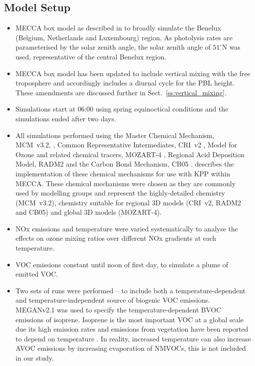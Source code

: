 \subsection{Model Setup} \label{ss:model_setup}
\begin{itemize}
    \item MECCA box model as described in \citet{Coates:2015} to broadly simulate the Benelux (Belgium, Netherlands and Luxembourg) region. As photolysis rates are parameterised by the solar zenith angle, the solar zenith angle of $51^{\circ}$N was used, representative of the central Benelux region.
    \item MECCA box model has been updated to include vertical mixing with the free troposphere and accordingly includes a diurnal cycle for the PBL height. These amendments are discussed further in Sect.~\ref{ss:vertical_mixing}.
    \item Simulations start at 06:00 using spring equinoctical conditions and the simulations ended after two days.
    \item All simulations performed using the Master Chemical Mechanism, MCM~v3.2, \citep{MCM_Site}, Common Representative Intermediates, CRI~v2 \citep{Jenkin:2008}, Model for Ozone and related chemical tracers, MOZART-4 \citep{Emmons:2010}, Regional Acid Deposition Model, RADM2 \citep{Stockwell:1990} and the Carbon Bond Mechanism, CB05 \citep{Yarwood:2005}. \citet{Coates:2015} describes the implementation of these chemical mechanisms for use with KPP within MECCA. These chemical mechanisms were chosen as they are commonly used by modelling groups and represent the highly-detailed chemistry (MCM~v3.2), chemistry suitable for regional 3D models (CRI~v2, RADM2 and CB05) and global 3D models (MOZART-4).
    \item NOx emissions and temperature were varied systematically to analyse the effects on ozone mixing ratios over different NOx gradients at each temperature.
    \item VOC emissions constant until noon of first day, to simulate a plume of emitted VOC.
    \item Two sets of runs were performed -- to include both a temperature-dependent and temperature-independent source of biogenic VOC emissions. MEGANv2.1 \citep{Guenther:2012} was used to specify the temperature-dependent BVOC emissions of isoprene. Isoprene is the most important VOC at a global scale due its high emission rates and emissions from vegetation have been reported to depend on temperature \citep{Guenther:2006}. In reality, increased temperature can also increase AVOC emissions by increasing evaporation of NMVOCs, this is not included in our study.

\end{itemize}
